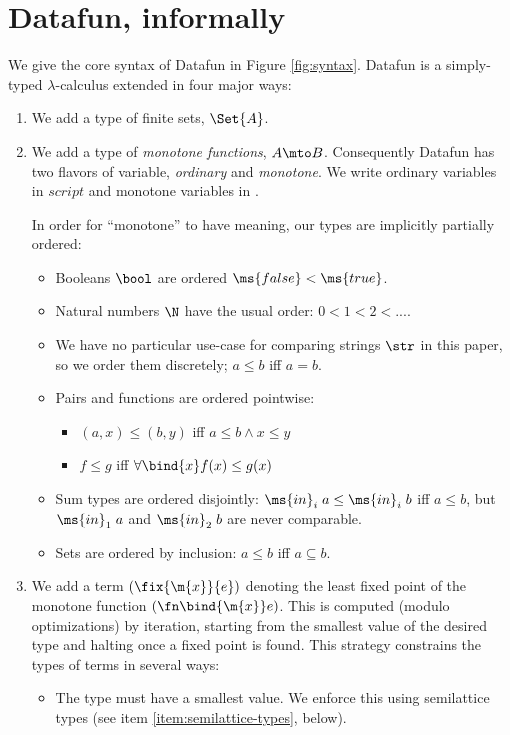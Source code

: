 
\section{Datafun, informally}
\label{sec:informally}

We give the core syntax of Datafun in Figure \ref{fig:syntax}. Datafun is a
simply-typed $\lambda$-calculus extended in four major ways:

\begin{enumerate}
\item We add a type of finite sets, $\Set{A}$.



\item We add a type of \emph{monotone functions}, $A \mto B$. Consequently
  Datafun has two flavors of variable, \emph{ordinary} and \emph{monotone}. We
  write ordinary variables in $script$ and monotone variables in .

  In order for ``monotone'' to have meaning, our types are implicitly partially
  ordered:
  \begin{itemize}
  \item Booleans $\bool$ are ordered $\ms{false} < \ms{true}$.
  \item Natural numbers $\N$ have the usual order: $0 < 1 < 2 < ...$.
  \item We have no particular use-case for comparing strings $\str$ in
    this paper, so we order them discretely; $a \le b$ iff $a = b$.
  \item Pairs and functions are ordered pointwise:
    \begin{itemize}
    \item $(a, x) \le (b, y)$ iff $a \le b \wedge x \le y$
    \item $f \le g$ iff $\forall \bind{x} f(x) \le g(x)$
    \end{itemize}
  \item Sum types are ordered disjointly: $\ms{in}_i\; a \le
    \ms{in}_i\; b$ iff $a \le b$, but $\ms{in}_1\; a$ and $\ms{in}_2\; b$ are
    never comparable.
  \item Sets are ordered by inclusion: $a \le b$ iff $a \subseteq b$.
  \end{itemize}

\item We add a term $(\fix{\m{x}}{e})$ denoting the least fixed point of the
  monotone function $(\fn\bind{\m{x}} e)$. This is computed (modulo
  optimizations) by iteration, starting from the smallest value of the desired
  type and halting once a fixed point is found. This strategy constrains the
  types of  terms in several ways:
  \begin{itemize}
  \item The type must have a smallest value. We enforce this using semilattice
    types (see item \ref{item:semilattice-types}, below).


\end{itemize}
\end{enumerate}
